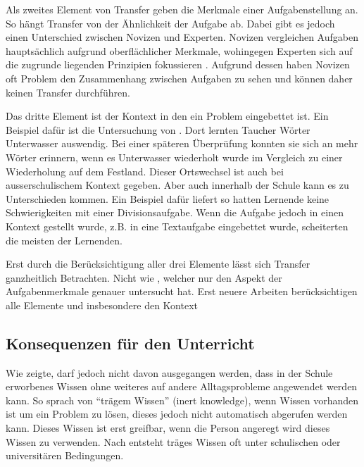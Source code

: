 Als zweites Element von Transfer geben \citeauthor{Marini1995} die Merkmale einer Aufgabenstellung an. So hängt Transfer von der Ähnlichkeit der Aufgabe ab. Dabei gibt es jedoch einen Unterschied zwischen Novizen und Experten. Novizen vergleichen Aufgaben hauptsächlich aufgrund oberflächlicher Merkmale, wohingegen Experten sich auf die zugrunde liegenden Prinzipien fokussieren \citep[s. S. 279]{Marini1995}. Aufgrund dessen haben Novizen oft Problem den Zusammenhang zwischen Aufgaben zu sehen und können daher keinen Transfer durchführen.

Das dritte Element ist der Kontext in den ein Problem eingebettet ist. Ein Beispiel dafür ist die Untersuchung von \citet{Godden1975}. Dort lernten Taucher Wörter Unterwasser auswendig. Bei einer späteren Überprüfung konnten sie sich an mehr Wörter erinnern, wenn es Unterwasser wiederholt wurde im Vergleich zu einer Wiederholung auf dem Festland. Dieser Ortswechsel ist auch bei ausserschulischem Kontext gegeben. Aber auch innerhalb der Schule kann es zu Unterschieden kommen. Ein Beispiel dafür liefert \citet{Schoenfeld1988} so hatten Lernende keine Schwierigkeiten mit einer Divisionsaufgabe. Wenn die Aufgabe jedoch in einen Kontext gestellt wurde, z.B. in eine Textaufgabe eingebettet wurde, scheiterten die meisten der Lernenden. 

Erst durch die Berücksichtigung aller drei Elemente lässt sich Transfer ganzheitlich Betrachten. Nicht wie  \citet{Woodworth1901}, welcher nur den Aspekt der Aufgabenmerkmale genauer untersucht hat. Erst neuere Arbeiten berücksichtigen alle Elemente und insbesondere den Kontext \citep{Lobato2002a, Detterman1993, Greeno1996}

\subsection{Konsequenzen für den Unterricht}
\label{sec:TransferUnterricht}

Wie \citet{claxton1990} zeigte, darf jedoch nicht davon ausgegangen werden, dass in der Schule erworbenes Wissen ohne weiteres auf andere Alltagsprobleme angewendet werden kann. So sprach \citet{Whitehead1929} von "`trägem Wissen"' (inert knowledge), wenn Wissen vorhanden ist um ein Problem zu lösen, dieses jedoch nicht automatisch abgerufen werden kann. Dieses Wissen ist erst greifbar, wenn die Person angeregt wird dieses Wissen zu verwenden. Nach \citet{Whitehead1929} entsteht träges Wissen oft unter schulischen oder universitären Bedingungen. 



